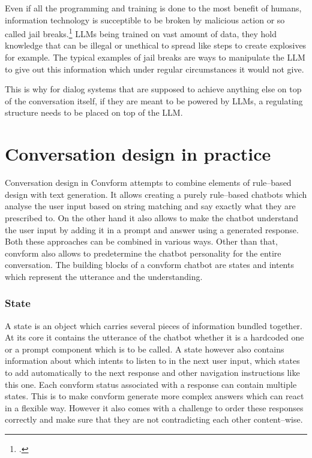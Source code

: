 \documentclass[12pt]{report}
\begin{document}
{Even if all the programming and training is done to the most benefit of humans,
information technology is succeptible to be broken by malicious action
or so called jail breaks.\footcite{zhou2024don, wei2023jailbroken}
LLMs being trained on vast amount of data,
they hold knowledge that can be illegal or unethical to spread
like steps to create explosives for example.
The typical examples of jail breaks are ways to manipulate
the LLM to give out this information
which under regular circumstances it would not give.

This is why for dialog systems that are supposed to achieve
anything else on top of the conversation itself,
if they are meant to be powered by LLMs,
a regulating structure needs to be placed on top of the LLM.

\section{Conversation design in practice}

\par
Conversation design in Convform attempts
to combine elements of rule–based design with text generation.
It allows creating a purely rule–based chatbots
which analyse the user input based on string matching
and say exactly what they are prescribed to.
On the other hand it also allows to make the chatbot
understand the user input by adding it in a prompt
and answer using a generated response.
Both these approaches can be combined in various ways.
Other than that, convform also allows to predetermine
the chatbot personality for the entire conversation.
The building blocks of a convform chatbot are
states and intents which represent the utterance and the understanding.

\subsubsection{State}
A state is an object which carries several pieces of information
bundled together.
At its core it contains the utterance of the chatbot
whether it is a hardcoded one or a prompt component which is to be called.
A state however also contains information about
which intents to listen to in the next user input,
which states to add automatically to the next response
and other navigation instructions like this one.
Each convform status associated with a response
can contain multiple states.
This is to make convform generate more complex answers
which can react in a flexible way.
However it also comes with a challenge to order these responses correctly
and make sure that they are not contradicting each other content–wise.

}
\end{document}

